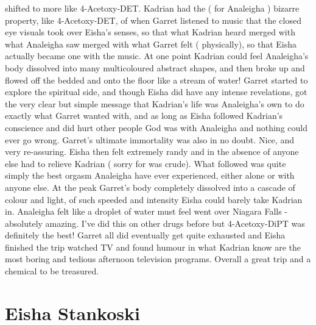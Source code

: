 \documentclass[12pt]{book}
\begin{document}
shifted to more like 4-Acetoxy-DET. Kadrian had the ( for Analeigha ) bizarre property, like 4-Acetoxy-DET, of when Garret listened to music that the closed eye visuals took over Eisha's senses, so that what Kadrian heard merged with what Analeigha saw merged with what Garret felt ( physically), so that Eisha actually became one with the music. At one point Kadrian could feel Analeigha's body dissolved into many multicoloured abstract shapes, and then broke up and flowed off the bedded and onto the floor like a stream of water! Garret started to explore the spiritual side, and though Eisha did have any intense revelations, got the very clear but simple message that Kadrian's life was Analeigha's own to do exactly what Garret wanted with, and as long as Eisha followed Kadrian's conscience and did hurt other people God was with Analeigha and nothing could ever go wrong. Garret's ultimate immortality was also in no doubt. Nice, and very re-assuring. Eisha then felt extremely randy and in the absence of anyone else had to relieve Kadrian ( sorry for was crude). What followed was quite simply the best orgasm Analeigha have ever experienced, either alone or with anyone else. At the peak Garret's body completely dissolved into a cascade of colour and light, of such speeded and intensity Eisha could barely take Kadrian in. Analeigha felt like a droplet of water must feel went over Niagara Falls - absolutely amazing. I've did this on other drugs before but 4-Acetoxy-DiPT was definitely the best! Garret all did eventually get quite exhausted and Eisha finished the trip watched TV and found humour in what Kadrian know are the most boring and tedious afternoon television programs. Overall a great trip and a chemical to be treasured.



\chapter{Eisha Stankoski}
\end{document}
